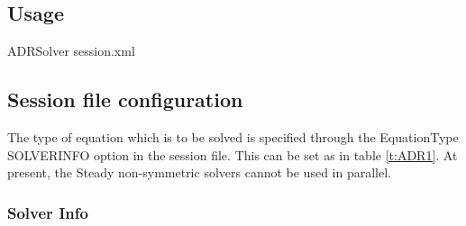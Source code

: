 \subsection{Usage}

ADRSolver session.xml

\subsection{Session file configuration}

The type of equation which is to be solved is specified through the EquationType 
SOLVERINFO option in the session file. This can be set as in table \ref{t:ADR1}.
At present, the Steady non-symmetric solvers cannot be used in parallel. \\

\subsubsection{Solver Info}

